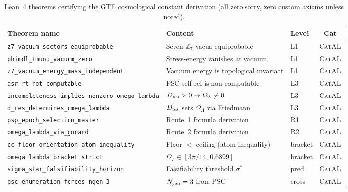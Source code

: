 \documentclass[11pt,a4paper]{article}
\newcommand{\lean}[1]{\texttt{#1}}
\newcommand{\OmL}{\Omega_\Lambda}
\newcommand{\Dres}{D_{\rm res}}
\newcommand{\ZS}{\mathbb{Z}_7}
\newcommand{\Ngen}{N_{\rm gen}}
\newcommand{\CatAL}{\textsc{CatAL}}
\begin{document}
\begin{table}[ht]
\centering
\caption{Lean~4 theorems certifying the GTE cosmological constant derivation
(all zero sorry, zero custom axioms unless noted).}
\label{tab:lean}
\scriptsize
\begin{tabular}{@{}p{6.4cm}p{4.8cm}lc@{}}
\toprule
Theorem name & Content & Level & Cat \\
\midrule
\lean{z7\_vacuum\_sectors\_equiprobable}      & Seven $\ZS$ vacua equiprobable & L1 & \CatAL \\
\lean{phimdl\_tmunu\_vacuum\_zero}            & Stress-energy vanishes at vacuum & L1 & \CatAL \\
\lean{z7\_vacuum\_energy\_mass\_independent} & Vacuum energy is topological invariant & L1 & \CatAL \\
\lean{asr\_rt\_not\_computable}              & PSC self-ref is non-computable & L3 & \CatAL \\
\lean{incompleteness\_implies\_nonzero\_omega\_lambda} & $\Dres > 0 \Rightarrow \OmL \neq 0$ & L3 & \CatAL \\
\lean{d\_res\_determines\_omega\_lambda}     & $\Dres$ sets $\OmL$ via Friedmann & L3 & \CatAL \\
\lean{psp\_epoch\_selection\_master}         & Route~1 formula derivation & R1 & \CatAL \\
\lean{omega\_lambda\_via\_gorard}            & Route~2 formula derivation & R2 & \CatAL \\
\lean{cc\_floor\_orientation\_atom\_inequality} & Floor $<$ ceiling (atom inequality) & bracket & \CatAL \\
\lean{omega\_lambda\_bracket\_strict}        & $\OmL \in [3\pi/14,\,0.6899]$ & bracket & \CatAL \\
\lean{sigma\_star\_falsifiability\_horizon}  & Falsifiability threshold $\sigma^*$ & pred. & \CatAL \\
\lean{psc\_enumeration\_forces\_ngen\_3}     & $\Ngen = 3$ from PSC & cross & \CatAL \\
\bottomrule
\end{tabular}
\end{table}

\bigskip
\end{document}
